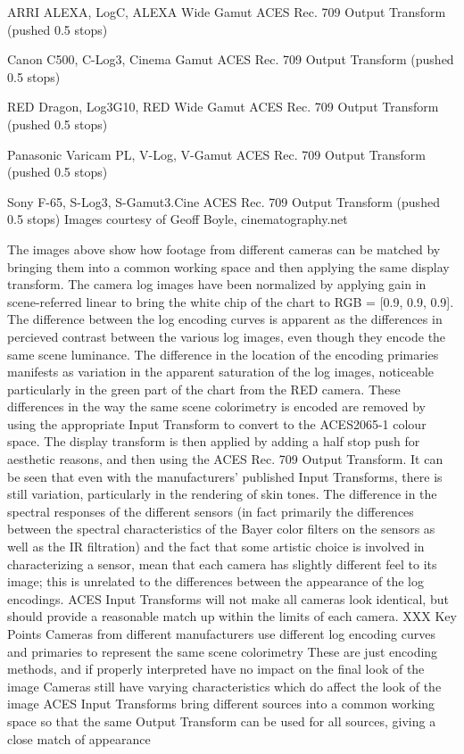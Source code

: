 ARRI ALEXA, LogC, ALEXA Wide Gamut	ACES Rec. 709 Output Transform (pushed 0.5 stops)

Canon C500, C-Log3, Cinema Gamut	ACES Rec. 709 Output Transform (pushed 0.5 stops)

RED Dragon, Log3G10, RED Wide Gamut	ACES Rec. 709 Output Transform (pushed 0.5 stops)

Panasonic Varicam PL, V-Log, V-Gamut	ACES Rec. 709 Output Transform (pushed 0.5 stops)

Sony F-65, S-Log3, S-Gamut3.Cine	ACES Rec. 709 Output Transform (pushed 0.5 stops)
Images courtesy of Geoff Boyle, cinematography.net

The images above show how footage from different cameras can be matched by bringing them into a common working space and then applying the same display transform. The camera log images have been normalized by applying gain in scene-referred linear to bring the white chip of the chart to RGB = [0.9, 0.9, 0.9]. The difference between the log encoding curves is apparent as the differences in percieved contrast between the various log images, even though they encode the same scene luminance. The difference in the location of the encoding primaries manifests as variation in the apparent saturation of the log images, noticeable particularly in the green part of the chart from the RED camera. These differences in the way the same scene colorimetry is encoded are removed by using the appropriate Input Transform to convert to the ACES2065-1 colour space. The display transform is then applied by adding a half stop push for aesthetic reasons, and then using the ACES Rec. 709 Output Transform. It can be seen that even with the manufacturers’ published Input Transforms, there is still variation, particularly in the rendering of skin tones. The difference in the spectral responses of the different sensors (in fact primarily the differences between the spectral characteristics of the Bayer color filters on the sensors as well as the IR filtration) and the fact that some artistic choice is involved in characterizing a sensor, mean that each camera has slightly different feel to its image; this is unrelated to the differences between the appearance of the log encodings. ACES Input Transforms will not make all cameras look identical, but should provide a reasonable match up within the limits of each camera.
XXX
Key Points
Cameras from different manufacturers use different log encoding curves and primaries to represent the same scene colorimetry
These are just encoding methods, and if properly interpreted have no impact on the final look of the image
Cameras still have varying characteristics which do affect the look of the image
ACES Input Transforms bring different sources into a common working space so that the same Output Transform can be used for all sources, giving a close match of appearance


